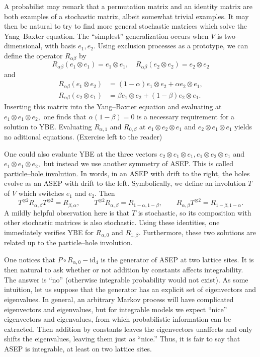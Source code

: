 \documentclass{ximera}
\begin{document}
A probabilist may remark that a permutation matrix and an identity matrix are both examples of a stochastic matrix,
albeit somewhat trivial examples. It may then be natural to try to find more general stochastic matrices
which solve the Yang--Baxter equation. The ``simplest'' generalization occurs when \(V\) is two--dimensional,
with basis \(e_1,e_2.\) Using exclusion processes as a prototype, we can define the operator $R_{\alpha\beta}$
by
\[
R_{\alpha\beta}(e_1 \otimes e_1) = e_1 \otimes e_1, \quad R_{\alpha\beta}(e_2\otimes e_2) = e_2 \otimes e_2
\]
and
\begin{align*}
R_{\alpha\beta}(e_1 \otimes e_2) &= (1-\alpha)e_1 \otimes e_2 + \alpha e_2 \otimes e_1,\\
R_{\alpha\beta}(e_2 \otimes e_1) &= \beta e_1\otimes e_2 + (1-\beta)e_2 \otimes e_1.
\end{align*}
Inserting this matrix into the Yang--Baxter equation and evaluating at \(e_1 \otimes e_1 \otimes e_2,\)
one finds that \(\alpha(1-\beta)=0\) is a necessary requirement for a solution to YBE. Evaluating
\( R_{\alpha,1}\) and \(R_{0,\beta}\) at \(e_1\otimes e_2 \otimes e_1\) and \(e_2 \otimes e_1 \otimes e_1\)
yields no aditional equations. (Exercise left to the reader)

One could also evaluate YBE at the three vectors \(e_2 \otimes e_1 \otimes e_1,e_1\otimes e_2 \otimes e_1\)
and \(e_1 \otimes e_1 \otimes e_2,\) but instead we use another symmetry of ASEP. This is called
\underline{particle--hole involution.} In words, in an ASEP with drift to the right, the holes evolve
as an ASEP with drift to the left. Symbolically, we define an involution \(T\) of \(V\) which
switches \(e_1\) and \(e_2.\) Then 
\[
T^{\otimes 2} R_{\alpha,\beta}T^{\otimes 2} = R_{\beta,\alpha}, \quad \quad T^{\otimes 2} R_{\alpha,\beta} = R_{1-\alpha,1-\beta}, \quad \quad R_{\alpha,\beta}T^{\otimes 2} = R_{1-\beta,1-\alpha}.
\]
A mildly helpful observation here is that \(T\) is stochastic, so its composition with other stochastic
matrices is also stochastic. Using these identities, one immediately verifies YBE for 
\(R_{\alpha,0}\) and \(R_{1,\beta}.\) Furthermore, these two solutions are related up to the particle--hole involution.

One notices that \(P\circ R_{\alpha,0}-\mathrm{id}_4\) is the generator of ASEP at two lattice sites. It is then
natural to ask whether or not addition by constants affects integrability. The answer is ``no'' (otherwise 
integrable probability would not exist). As some intuition, let us suppose that the generator has an 
explicit set of eigenvectors and eigenvalues. In general, an arbitrary Markov process will have 
complicated eigenvectors and eigenvalues, but for integrable models we expect ``nice'' eigenvectors
and eigenvalues, from which probabilistic information can be extracted. Then addition by constants leaves
the eigenvectors unaffects and only shifts the eigenvalues, leaving them just as ``nice.'' Thus, 
it is fair to say that ASEP is integrable, at least on two lattice sites. 
\end{document}

